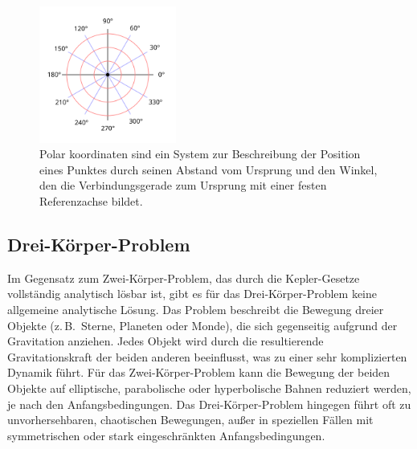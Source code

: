 \documentclass[a4paper,12pt,twoside]{article}
\begin{document}
\begin{figure}[H]
	\centering
	\includegraphics[width=0.4\textwidth]{Polarkoordinaten.svg.png}
	\caption[Eintrag in Abbildungsverzeichnis von Polarkoordinatsystem]{Polar koordinaten sind ein System zur Beschreibung der Position eines Punktes durch seinen Abstand vom Ursprung und den Winkel, den die Verbindungsgerade zum Ursprung mit einer festen Referenzachse bildet.}
	\label{polarkoordinatsystem.}
\end{figure}

\subsection{Drei-Körper-Problem}
Im Gegensatz zum Zwei-Körper-Problem, das durch die Kepler-Gesetze vollständig analytisch lösbar ist, gibt es für das Drei-Körper-Problem keine allgemeine analytische Lösung. Das Problem beschreibt die Bewegung dreier Objekte (z.\,B.\ Sterne, Planeten oder Monde), die sich gegenseitig aufgrund der Gravitation anziehen. Jedes Objekt wird durch die resultierende Gravitationskraft der beiden anderen beeinflusst, was zu einer sehr komplizierten Dynamik führt.
Für das Zwei-Körper-Problem kann die Bewegung der beiden Objekte auf elliptische, parabolische oder hyperbolische Bahnen reduziert werden, je nach den Anfangsbedingungen. Das Drei-Körper-Problem hingegen führt oft zu unvorhersehbaren, chaotischen Bewegungen, außer in speziellen Fällen mit symmetrischen oder stark eingeschränkten Anfangsbedingungen.
\end{document}
